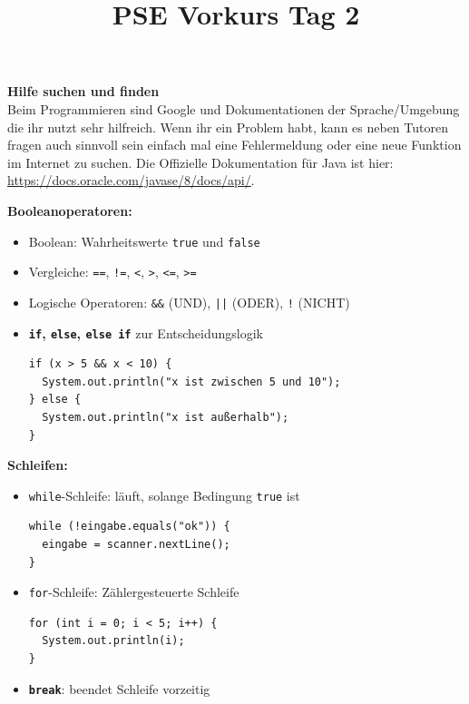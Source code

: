\documentclass{../../sheet}
\title{PSE Vorkurs Tag 2}
\begin{document}
\maketitle

\textbf{Hilfe suchen und finden}\\
Beim Programmieren sind Google und Dokumentationen der Sprache/Umgebung die ihr nutzt sehr hilfreich. Wenn ihr ein Problem habt, kann es neben Tutoren fragen auch sinnvoll sein einfach mal eine Fehlermeldung oder eine neue Funktion im Internet zu suchen. Die Offizielle Dokumentation für Java ist hier: \url{https://docs.oracle.com/javase/8/docs/api/}.

\textbf{Booleanoperatoren:}
\begin{itemize}
		\item Boolean: Wahrheitswerte \texttt{true} und \texttt{false}
		\item Vergleiche: \texttt{==}, \texttt{!=}, \texttt{<}, \texttt{>}, \texttt{<=}, \texttt{>=}
		\item Logische Operatoren: \texttt{\&\&} (UND), \texttt{||} (ODER), \texttt{!} (NICHT)
		\item \textbf{\texttt{if}, \texttt{else}, \texttt{else if}} zur Entscheidungslogik
		      \begin{verbatim}
if (x > 5 && x < 10) {
  System.out.println("x ist zwischen 5 und 10");
} else {
  System.out.println("x ist außerhalb");
}
          \end{verbatim}
	\end{itemize}
    \bigskip
\textbf{Schleifen:}
\begin{itemize}
		\item \texttt{while}-Schleife: läuft, solange Bedingung \texttt{true} ist
		      \begin{verbatim}
while (!eingabe.equals("ok")) {
  eingabe = scanner.nextLine();
}
          \end{verbatim}
		\item \texttt{for}-Schleife: Zählergesteuerte Schleife
		      \begin{verbatim}
for (int i = 0; i < 5; i++) {
  System.out.println(i);
}
          \end{verbatim}
		\item \textbf{\texttt{break}}: beendet Schleife vorzeitig

	\end{itemize}
\end{document}
